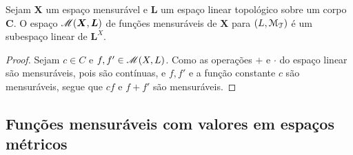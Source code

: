 \begin{proposition}
Sejam $\bm X$ um espaço mensurável e $\bm L$ um espaço linear topológico sobre um corpo $\bm C$. O espaço $\mathscr{M}(\bm X,\bm L)$ de funções mensuráveis de $\bm X$ para $(L,\mathcal{M}_{\mathcal{T}})$ é um subespaço linear de ${\bm L}^X$.
\end{proposition}
\begin{proof}
Sejam $c \in C$ e $f,f' \in \mathscr{M}(X,L)$. Como as operações $+$ e $\cdot$ do espaço linear são mensuráveis, pois são contínuas, e $f,f'$ e a função constante $c$ são mensuráveis, segue que $cf$ e $f+f'$ são mensuráveis.
\end{proof}

\subsection{Funções mensuráveis com valores em espaços métricos}

